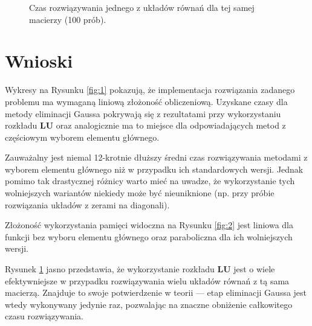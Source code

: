 \documentclass{classrep}
\newcommand{\mL}{\bm{L}}
\newcommand{\mU}{\bm{U}}
\begin{document}
\begin{figure}[!h]
		\caption{Czas rozwiązywania jednego z układów równań dla tej samej macierzy (100 prób).}  
		\label{fig:3}  			
	\end{figure}
\section{Wnioski}
	Wykresy na Rysunku \ref{fig:1} pokazują, że implementacja rozwiązania zadanego problemu ma wymaganą liniową złożoność obliczeniową. 
	Uzyskane czasy dla metody eliminacji Gaussa pokrywają się z rezultatami przy wykorzystaniu rozkładu $\mL\mU$ oraz analogicznie ma to miejsce dla odpowiadających metod z częściowym wyborem elementu głównego.
	
	Zauważalny jest niemal 12-krotnie dłuższy średni czas rozwiązywania metodami z wyborem elementu głównego niż w przypadku ich standardowych wersji. Jednak pomimo tak drastycznej różnicy warto mieć na uwadze, że wykorzystanie tych wolniejszych wariantów niekiedy może być nieuniknione (np. przy próbie rozwiązania układów z zerami na diagonali).
	
	Złożoność wykorzystania pamięci widoczna na Rysunku \ref{fig:2} jest liniowa dla funkcji bez wyboru elementu głównego oraz paraboliczna dla ich wolniejszych wersji.
	
	Rysunek \ref{fig:3} jasno przedstawia, że wykorzystanie rozkładu $\mL\mU$ jest o wiele efektywniejsze w przypadku rozwiązywania wielu układów równań z tą sama macierzą. Znajduje to swoje potwierdzenie w teorii --- etap eliminacji Gaussa jest wtedy wykonywany jedynie raz, pozwalając na znaczne obniżenie całkowitego czasu rozwiązywania. 
	
	
\end{document}
